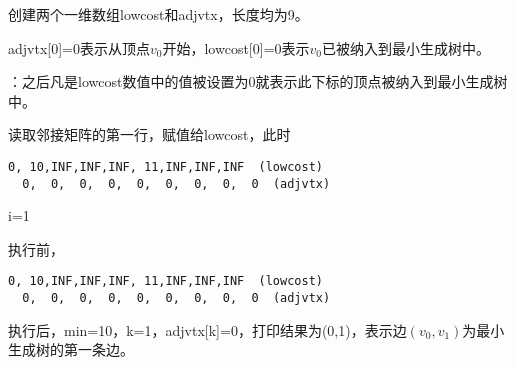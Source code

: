 \begin{frame}\ft{\subsubsecname}
  \begin{small}

    
  \end{small}
\end{frame}

\begin{frame}\ft{\subsubsecname}

\end{frame}

\begin{frame}\ft{\subsubsecname}
\tf 创建两个一维数组lowcost和adjvtx，长度均为9。%
\vspace{0.1in} 




\tf adjvtx[0]=0表示从顶点$v_0$开始，lowcost[0]=0表示$v_0$已被纳入到最小生成树中。 \vspace{0.1in} %

：之后凡是lowcost数值中的值被设置为0就表示此下标的顶点被纳入到最小生成树中。

\end{frame}

\begin{frame}[fragile]\ft{\subsubsecname}
\tf 

读取邻接矩阵的第一行，赋值给lowcost，此时 
\begin{lstlisting}[xleftmargin=2em]
  0, 10,INF,INF,INF, 11,INF,INF,INF  (lowcost)
  0,  0,  0,  0,  0,  0,  0,  0,  0  (adjvtx)
\end{lstlisting}
 

\end{frame}


\begin{frame}[fragile]\ft{\subsubsecname}
\tf i=1 

执行前，
\begin{lstlisting}[xleftmargin=2em]
  0, 10,INF,INF,INF, 11,INF,INF,INF  (lowcost)
  0,  0,  0,  0,  0,  0,  0,  0,  0  (adjvtx)
\end{lstlisting} %
执行后，min=10，k=1，adjvtx[k]=0，打印结果为(0,1)，表示边$(v_0,v_1)$为最小生成树的第一条边。
\end{frame}


